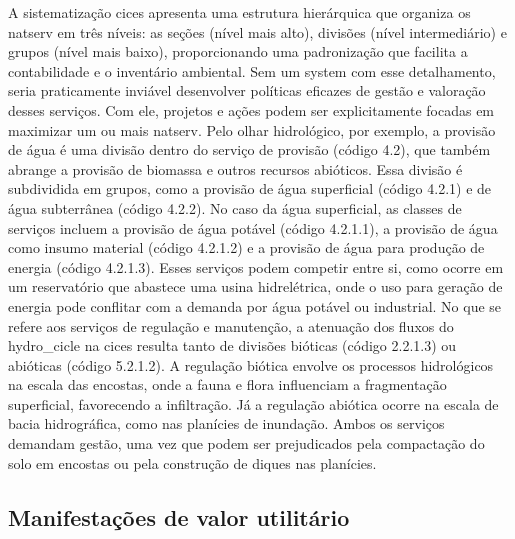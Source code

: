 \documentclass[./main.tex]{subfiles}
\begin{document}
\par A sistematização \acrshort{cices} apresenta uma estrutura hierárquica que organiza os \gls{natserv} em três níveis: as seções (nível mais alto), divisões (nível intermediário) e grupos (nível mais baixo), proporcionando uma padronização que facilita a contabilidade e o inventário ambiental. Sem um \gls{system} com esse detalhamento, seria praticamente inviável desenvolver políticas eficazes de gestão e valoração desses serviços. Com ele, projetos e ações podem ser explicitamente focadas em maximizar um ou mais \gls{natserv}. Pelo olhar hidrológico, por exemplo, a provisão de água é uma divisão dentro do serviço de provisão (código 4.2), que também abrange a provisão de biomassa e outros recursos abióticos. Essa divisão é subdividida em grupos, como a provisão de água superficial (código 4.2.1) e de água subterrânea (código 4.2.2). No caso da água superficial, as classes de serviços incluem a provisão de água potável (código 4.2.1.1), a provisão de água como insumo material (código 4.2.1.2) e a provisão de água para produção de energia (código 4.2.1.3). Esses serviços podem competir entre si, como ocorre em um reservatório que abastece uma usina hidrelétrica, onde o uso para geração de energia pode conflitar com a demanda por água potável ou industrial. No que se refere aos serviços de regulação e manutenção, a atenuação dos fluxos do \gls{hydro_cicle} na \acrshort{cices} resulta tanto de divisões bióticas (código 2.2.1.3) ou abióticas (código 5.2.1.2). A regulação biótica envolve os processos hidrológicos na escala das encostas, onde a fauna e flora influenciam a fragmentação superficial, favorecendo a infiltração. Já a regulação abiótica ocorre na escala de bacia hidrográfica, como nas planícies de inundação. Ambos os serviços demandam gestão, uma vez que podem ser prejudicados pela compactação do solo em encostas ou pela construção de diques nas planícies.

\subsection{Manifestações de valor utilitário} \label{sec:natserv:value}
\end{document}
